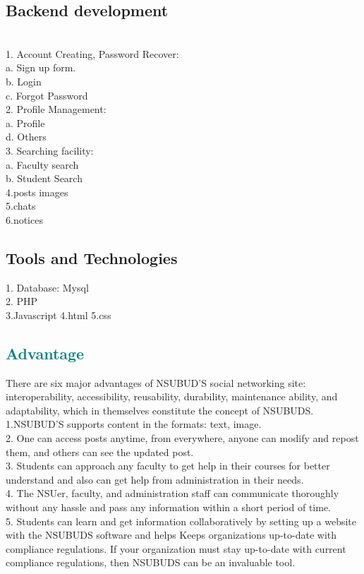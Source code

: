 {\subsection{Backend development}\\
1. Account Creating, Password Recover:\\
a. Sign up form.\\
b. Login\\
c. Forgot Password\\
2. Profile Management:\\
a.  Profile\\
d. Others\\
3. Searching facility:\\
a. Faculty search\\
b. Student Search\\
4.posts images\\
5.chats\\
6.notices\\
\lipsum  %
\subsection{Tools and Technologies}

1. Database: Mysql\\
2. PHP\\
3.Javascript
4.html
5.css
\newpage
{\textcolor{teal}{\section{Advantage}}

\lipsum  %
There are six major advantages of NSUBUD'S social networking site:
interoperability, accessibility, reusability, durability, maintenance ability, and adaptability, which in themselves constitute the concept of NSUBUDS.
1.NSUBUD'S supports content in the formats: text, image.\\
2. One can access posts anytime, from everywhere, anyone can modify and repost them, and others can see the updated post.\\
3. Students can approach any faculty to get help in their courses for better understand and also can get help from administration in their needs.\\
4. The NSUer, faculty, and administration staff can communicate thoroughly without any hassle and pass any information within a short period of time.\\
5. Students can learn and get information collaboratively by setting up a website with the NSUBUDS software and
helps Keeps organizations up-to-date with compliance
regulations. If your organization must stay up-to-date with current compliance regulations, then NSUBUDS can be an invaluable tool.\\


}}
